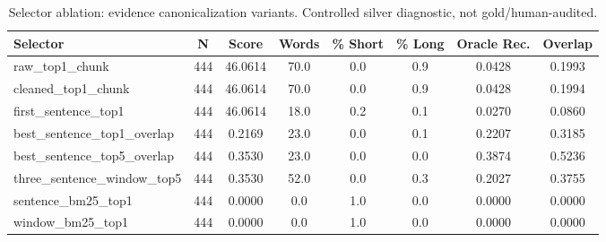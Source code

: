\begin{table}[ht]
\centering
\caption{Selector ablation: evidence canonicalization variants. Controlled silver diagnostic, not gold/human-audited.}
\label{tab:selector_ablation}
\begin{tabular}{lccccccc}
\toprule
Selector & N & Score & Words & \% Short & \% Long & Oracle Rec. & Overlap \\
\midrule
raw_top1_chunk & 444 & 46.0614 & 70.0 & 0.0 & 0.9 & 0.0428 & 0.1993 \\
cleaned_top1_chunk & 444 & 46.0614 & 70.0 & 0.0 & 0.9 & 0.0428 & 0.1994 \\
first_sentence_top1 & 444 & 46.0614 & 18.0 & 0.2 & 0.1 & 0.0270 & 0.0860 \\
best_sentence_top1_overlap & 444 & 0.2169 & 23.0 & 0.0 & 0.1 & 0.2207 & 0.3185 \\
best_sentence_top5_overlap & 444 & 0.3530 & 23.0 & 0.0 & 0.0 & 0.3874 & 0.5236 \\
three_sentence_window_top5 & 444 & 0.3530 & 52.0 & 0.0 & 0.3 & 0.2027 & 0.3755 \\
sentence_bm25_top1 & 444 & 0.0000 & 0.0 & 1.0 & 0.0 & 0.0000 & 0.0000 \\
window_bm25_top1 & 444 & 0.0000 & 0.0 & 1.0 & 0.0 & 0.0000 & 0.0000 \\
\bottomrule
\end{tabular}
\end{table}
